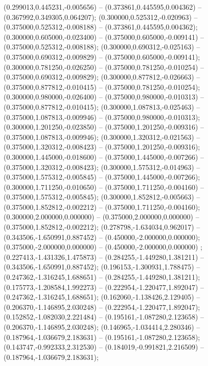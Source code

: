  (0.299013,0.445231,-0.005656) -- (0.373861,0.445595,0.004362) -- (0.367992,0.349305,0.064207);
 (0.300000,0.525312,-0.020963) -- (0.375000,0.525312,-0.008188) -- (0.373861,0.445595,0.004362);
 (0.300000,0.605000,-0.023400) -- (0.375000,0.605000,-0.009141) -- (0.375000,0.525312,-0.008188);
 (0.300000,0.690312,-0.025163) -- (0.375000,0.690312,-0.009829) -- (0.375000,0.605000,-0.009141);
 (0.300000,0.781250,-0.026250) -- (0.375000,0.781250,-0.010254) -- (0.375000,0.690312,-0.009829);
 (0.300000,0.877812,-0.026663) -- (0.375000,0.877812,-0.010415) -- (0.375000,0.781250,-0.010254);
 (0.300000,0.980000,-0.026400) -- (0.375000,0.980000,-0.010313) -- (0.375000,0.877812,-0.010415);
 (0.300000,1.087813,-0.025463) -- (0.375000,1.087813,-0.009946) -- (0.375000,0.980000,-0.010313);
 (0.300000,1.201250,-0.023850) -- (0.375000,1.201250,-0.009316) -- (0.375000,1.087813,-0.009946);
 (0.300000,1.320312,-0.021563) -- (0.375000,1.320312,-0.008423) -- (0.375000,1.201250,-0.009316);
 (0.300000,1.445000,-0.018600) -- (0.375000,1.445000,-0.007266) -- (0.375000,1.320312,-0.008423);
 (0.300000,1.575312,-0.014963) -- (0.375000,1.575312,-0.005845) -- (0.375000,1.445000,-0.007266);
 (0.300000,1.711250,-0.010650) -- (0.375000,1.711250,-0.004160) -- (0.375000,1.575312,-0.005845);
 (0.300000,1.852812,-0.005663) -- (0.375000,1.852812,-0.002212) -- (0.375000,1.711250,-0.004160);
 (0.300000,2.000000,0.000000) -- (0.375000,2.000000,0.000000) -- (0.375000,1.852812,-0.002212);
 (0.278798,-1.634034,0.962017) -- (0.343506,-1.650991,0.887452) -- (0.450000,-2.000000,0.000000);
 (0.375000,-2.000000,0.000000) -- (0.450000,-2.000000,0.000000) ;
 (0.227413,-1.431326,1.475873) -- (0.284255,-1.449280,1.381211) -- (0.343506,-1.650991,0.887452);
 (0.196153,-1.300931,1.788475) -- (0.247362,-1.316245,1.688651) -- (0.284255,-1.449280,1.381211);
 (0.175773,-1.208584,1.992273) -- (0.222954,-1.220477,1.892047) -- (0.247362,-1.316245,1.688651);
 (0.162060,-1.138426,2.129405) -- (0.206370,-1.146895,2.030248) -- (0.222954,-1.220477,1.892047);
 (0.152852,-1.082030,2.221484) -- (0.195161,-1.087280,2.123658) -- (0.206370,-1.146895,2.030248);
 (0.146965,-1.034414,2.280346) -- (0.187964,-1.036679,2.183631) -- (0.195161,-1.087280,2.123658);
 (0.143747,-0.992333,2.312530) -- (0.184019,-0.991821,2.216509) -- (0.187964,-1.036679,2.183631);
